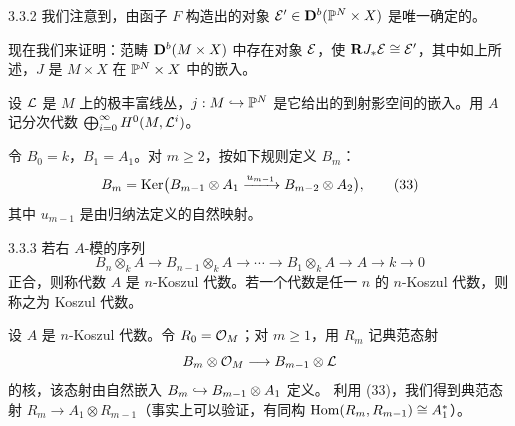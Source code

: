 \begin{remark}{3.3.2}
我们注意到，由函子 $F$ 构造出的对象 $\mathcal{E}'\in\mathbf{D}^{b}(\mathbb{P}^{N}\times X)$ 是唯一确定的。
\end{remark}

现在我们来证明：范畴 $\mathbf{D}^{b}(M\times X)$ 中存在对象 $\mathcal{E}$，使 $\mathbf{R} J_{*}\mathcal{E}\cong\mathcal{E}'$，其中如上所述，$J$ 是 $M\times X$ 在 $\mathbb{P}^{N}\times X$ 中的嵌入。

设 $\mathcal{L}$ 是 $M$ 上的极丰富线丛，$j:M\hookrightarrow\mathbb{P}^{N}$ 是它给出的到射影空间的嵌入。用 $A$ 记分次代数 $\bigoplus_{i=0}^{\infty}H^{0}(M,\mathcal{L}^{i})$。

令 $B_{0}=k$，$B_{1}=A_{1}$。对 $m\geqslant2$，按如下规则定义 $B_{m}$：
\begin{equation}
B_{m}=\operatorname{Ker}\bigl(B_{m-1}\otimes A_{1}\xrightarrow{u_{m-1}}B_{m-2}\otimes A_{2}\bigr),
\tag{33}
\end{equation}
其中 $u_{m-1}$ 是由归纳法定义的自然映射。

\begin{definition}{3.3.3}
若右 $A$-模的序列
\begin{equation*}
B_{n}\otimes_{k}A\longrightarrow B_{n-1}\otimes_{k}A\longrightarrow\cdots\longrightarrow B_{1}\otimes_{k}A\longrightarrow A\longrightarrow k\longrightarrow0
\end{equation*}
正合，则称代数 $A$ 是 $n$-Koszul 代数。若一个代数是任一 $n$ 的 $n$-Koszul 代数，则称之为 Koszul 代数。
\end{definition}


设 $A$ 是 $n$-Koszul 代数。令 $R_{0}=\mathcal{O}_{M}$；对 $m\geqslant1$，用 $R_{m}$ 记典范态射
\begin{equation*}
B_{m}\otimes\mathcal{O}_{M}\longrightarrow B_{m-1}\otimes\mathcal{L}
\end{equation*}
的核，该态射由自然嵌入 $B_{m}\hookrightarrow B_{m-1}\otimes A_{1}$ 定义。
利用 (33)，我们得到典范态射 $R_{m}\to A_{1}\otimes R_{m-1}$（事实上可以验证，有同构 $\operatorname{Hom}(R_{m},R_{m-1})\cong A_{1}^{*}$）。

